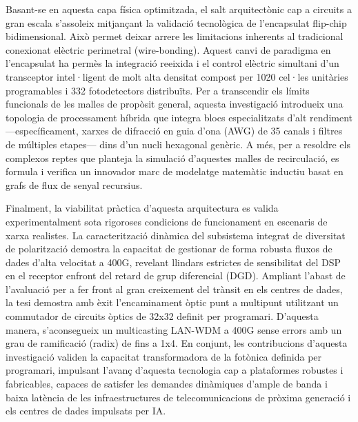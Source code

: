 Basant-se en aquesta capa física optimitzada, el salt arquitectònic cap a circuits a gran escala 
s'assoleix mitjançant la validació tecnològica de l'encapsulat flip-chip bidimensional. Això permet 
deixar arrere les limitacions inherents al tradicional conexionat elèctric perimetral 
(wire-bonding). Aquest canvi de paradigma en l'encapsulat ha permès la integració reeixida i el 
control elèctric simultani d'un transceptor intel·ligent de molt alta densitat compost per 1020 
cel·les unitàries programables i 332 fotodetectors distribuïts. Per a transcendir els límits 
funcionals de les malles de propòsit general, aquesta investigació introdueix una topologia de 
processament híbrida que integra blocs especialitzats d'alt rendiment —específicament, xarxes de 
difracció en guia d'ona (AWG) de 35 canals i filtres de múltiples etapes— dins d'un nucli hexagonal 
genèric. A més, per a resoldre els complexos reptes que planteja la simulació d'aquestes malles de 
recirculació, es formula i verifica un innovador marc de modelatge matemàtic inductiu basat en 
grafs de flux de senyal recursius.

Finalment, la viabilitat pràctica d'aquesta arquitectura es valida experimentalment sota rigoroses 
condicions de funcionament en escenaris de xarxa realistes. La caracterització dinàmica del 
subsistema integrat de diversitat de polarització demostra la capacitat de gestionar de forma 
robusta fluxos de dades d'alta velocitat a 400G, revelant llindars estrictes de sensibilitat del 
DSP en el receptor enfront del retard de grup diferencial (DGD). Ampliant l'abast de l'avaluació 
per a fer front al gran creixement del trànsit en els centres de dades, la tesi demostra amb èxit 
l'encaminament òptic punt a multipunt utilitzant un commutador de circuits òptics de 32x32 definit 
per programari. D'aquesta manera, s'aconsegueix un multicasting LAN-WDM a 400G sense errors amb un 
grau de ramificació (radix) de fins a 1x4. En conjunt, les contribucions d'aquesta investigació 
validen la capacitat transformadora de la fotònica definida per programari, impulsant l'avanç 
d'aquesta tecnologia cap a plataformes robustes i fabricables, capaces de satisfer les demandes 
dinàmiques d'ample de banda i baixa latència de les infraestructures de telecomunicacions de 
pròxima generació i els centres de dades impulsats per IA.
